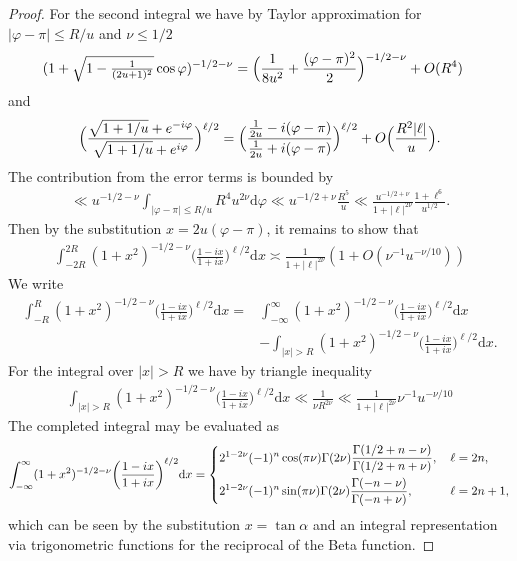 \documentclass[10pt,a4paper]{amsart}
\renewcommand{\d}{\mathrm d}
\begin{document}
\begin{proof}
For the second integral we have by Taylor approximation for $|\varphi-\pi| \leq R/u$  and $\nu \leq 1/2$
\begin{align*}
  (1+\sqrt{1-\tfrac{1}{(2u+1)^2}} \cos \varphi)^{-1/2-\nu}
 & = \Bigl(\frac{1}{8 u^2} + \frac{(\varphi-\pi)^2}{2}\Bigr)^{-1/2-\nu} + O( R^4 ) 
\end{align*}
and
\begin{align*}
    \Bigl( \frac{\sqrt{1+1/u} + e^{-i\varphi}}{\sqrt{1+1/u} + e^{i\varphi}} \Bigr)^{\ell/2}=\Bigl(\frac{\frac{1}{2u}-i(\varphi-\pi)}{\frac{1}{2u}+i(\varphi-\pi)}\Bigr)^{\ell/2}+O\Bigl(\frac{R^2 |\ell| }{u}\Bigr).
\end{align*}
The contribution from the error terms is bounded by
\begin{align*}
\ll  u^{-1/2-\nu} \int_{|\varphi-\pi| \leq R/u} R^4 u^{2\nu} \d \varphi \ll   u^{-1/2+\nu}  \frac{R^5}{u} \ll \frac{u^{-1/2+\nu}}{1+|\ell|^{2\nu}} \frac{1+\ell^{6}}{u^{1/2}}.
\end{align*}
Then by the substitution $x=2u(\varphi-\pi)$, it remains to show that 
\begin{align*}
   \int_{-2R}^{2R } ( 1+ x^2) ^{-1/2-\nu}\bigg( \frac{1-ix}{1+ix}\bigg)^{\ell/2} \d x \asymp \frac{1}{1+|\ell|^{2\nu}}(1+ O(\nu^{-1} u^{-\nu/10}))
\end{align*}
We write
\begin{align*}
       \int_{-R}^{R} ( 1+ x^2) ^{-1/2-\nu}\bigg( \frac{1-ix}{1+ix}\bigg)^{\ell/2} \d x  =    &\int_{-\infty }^{\infty} ( 1+ x^2) ^{-1/2-\nu}\bigg( \frac{1-ix}{1+ix}\bigg)^{\ell/2} \d x  \\
       &- \int_{|x| > R} ( 1+ x^2) ^{-1/2-\nu}\bigg( \frac{1-ix}{1+ix}\bigg)^{\ell/2} \d x.
\end{align*}
For the integral over $|x| > R$ we have by triangle inequality
\begin{align*}
     \int_{|x| > R} ( 1+ x^2) ^{-1/2-\nu}\bigg( \frac{1-ix}{1+ix}\bigg)^{\ell/2} \d x  \ll  \frac{1}{\nu R^{2\nu}} \ll  \frac{1}{1+|\ell|^{2\nu}}\nu^{-1} u^{-\nu/10}
\end{align*}
The completed integral may be evaluated as
\begin{align*}
    \int_{-\infty }^{\infty} ( 1+ x^2) ^{-1/2-\nu}\bigg( \frac{1-ix}{1+ix}\bigg)^{\ell/2} \d x  = \begin{dcases}
       2^{1-2\nu} (-1)^n  \cos(\pi \nu) \Gamma(2\nu)\frac{\Gamma(1/2+n-\nu)}{\Gamma(1/2+n+\nu)} , \, &\ell=2n, \\
        2^{1-2\nu} (-1)^{n}\sin(\pi\nu) \Gamma(2\nu)\frac{\Gamma(-n-\nu)}{\Gamma(-n+\nu)}, \, &\ell=2n+1,
    \end{dcases}
\end{align*}
which can be seen by the substitution $x= \tan \alpha$ and an integral representation via trigonometric functions for the reciprocal of the Beta function. 
\end{proof}
\end{document}
